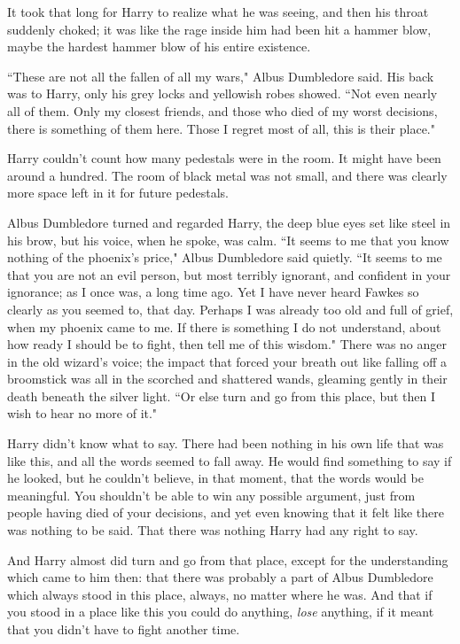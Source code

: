 It took that long for Harry to realize what he was seeing, and then his throat suddenly choked; it was like the rage inside him had been hit a hammer blow, maybe the hardest hammer blow of his entire existence.

``These are not all the fallen of all my wars," Albus Dumbledore said. His back was to Harry, only his grey locks and yellowish robes showed. ``Not even nearly all of them. Only my closest friends, and those who died of my worst decisions, there is something of them here. Those I regret most of all, this is their place."

Harry couldn't count how many pedestals were in the room. It might have been around a hundred. The room of black metal was not small, and there was clearly more space left in it for future pedestals.

Albus Dumbledore turned and regarded Harry, the deep blue eyes set like steel in his brow, but his voice, when he spoke, was calm. ``It seems to me that you know nothing of the phoenix's price," Albus Dumbledore said quietly. ``It seems to me that you are not an evil person, but most terribly ignorant, and confident in your ignorance; as I once was, a long time ago. Yet I have never heard Fawkes so clearly as you seemed to, that day. Perhaps I was already too old and full of grief, when my phoenix came to me. If there is something I do not understand, about how ready I should be to fight, then tell me of this wisdom." There was no anger in the old wizard's voice; the impact that forced your breath out like falling off a broomstick was all in the scorched and shattered wands, gleaming gently in their death beneath the silver light. ``Or else turn and go from this place, but then I wish to hear no more of it."

Harry didn't know what to say. There had been nothing in his own life that was like this, and all the words seemed to fall away. He would find something to say if he looked, but he couldn't believe, in that moment, that the words would be meaningful. You shouldn't be able to win any possible argument, just from people having died of your decisions, and yet even knowing that it felt like there was nothing to be said. That there was nothing Harry had any right to say.

And Harry almost did turn and go from that place, except for the understanding which came to him then: that there was probably a part of Albus Dumbledore which always stood in this place, always, no matter where he was. And that if you stood in a place like this you could do anything, \emph{lose} anything, if it meant that you didn't have to fight another time.

